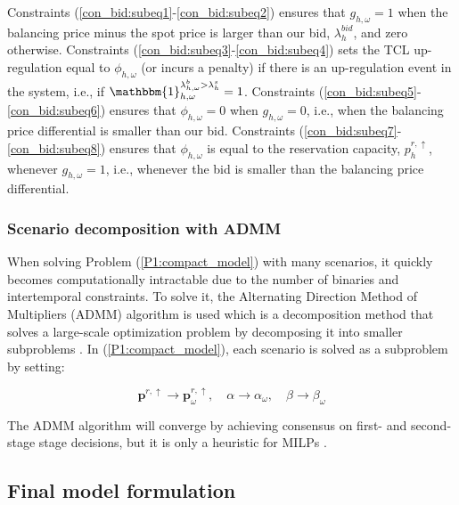 Constraints (\ref{con_bid:subeq1}-\ref{con_bid:subeq2}) ensures that $g_{h,\omega} = 1$ when the balancing price minus the spot price is larger than our bid, $\lambda^{bid}_{h}$, and zero otherwise. Constraints (\ref{con_bid:subeq3}-\ref{con_bid:subeq4}) sets the TCL up-regulation equal to $\phi_{h,\omega}$ (or incurs a penalty) if there is an up-regulation event in the system, i.e., if $\mathbbm{1}_{h,\omega}^{\lambda^{b}_{h,\omega} > \lambda^{s}_{h}} = 1$. Constraints (\ref{con_bid:subeq5}-\ref{con_bid:subeq6}) ensures that $\phi_{h,\omega} = 0$ when $g_{h,\omega} = 0$, i.e., when the balancing price differential is smaller than our bid. Constraints (\ref{con_bid:subeq7}-\ref{con_bid:subeq8}) ensures that $\phi_{h,\omega}$ is equal to the reservation capacity, $p^{r,\uparrow}_{h}$, whenever $g_{h,\omega} = 1$, i.e., whenever the bid is smaller than the balancing price differential.

\subsubsection{Scenario decomposition with ADMM}

When solving Problem (\ref{P1:compact_model}) with many scenarios, it quickly becomes computationally intractable due to the number of binaries and intertemporal constraints. To solve it, the Alternating Direction Method of Multipliers (ADMM) algorithm is used which is a decomposition method that solves a large-scale optimization problem by decomposing it into smaller subproblems \cite{boyd2011distributed}. In (\ref{P1:compact_model}), each scenario is solved as a subproblem by setting:

\begin{equation}\label{eq:non_anticipativity}
    \bm{p}^{r,\uparrow} \rightarrow \bm{p}^{r,\uparrow}_{\omega}, \quad \alpha \rightarrow \alpha_{\omega}, \quad \beta \rightarrow \beta_{\omega}
\end{equation}

The ADMM algorithm will converge by achieving consensus on first- and second-stage stage decisions, but it is only a heuristic for MILPs \cite{hong2016convergence}.

\subsection{Final model formulation}\label{sec:final_model}


